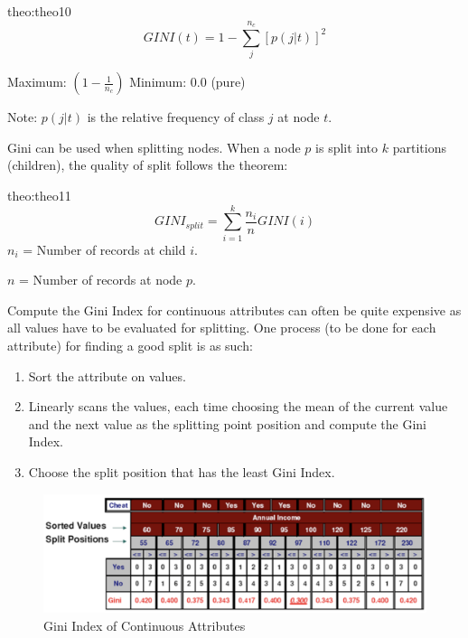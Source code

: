 \begin{theo}{theo:theo10}
    \label{eq:giniindex}
        \[
            GINI(t) = 1 - \sum_j^{n_c}\left[p(j|t)\right]^2
        \]
        \begin{center}
            Maximum: $(1-\frac{1}{n_c})$ \qquad\qquad Minimum: $0.0$ (pure)
        \end{center}
        Note: $p(j|t)$ is the relative frequency of class $j$ at node $t$.
\end{theo}

Gini can be used when splitting nodes. When a node $p$ is split into $k$ partitions (children), the quality of split follows the theorem:

\begin{theo}{theo:theo11}
    \label{eq:ginisplit}
        \[
            GINI_{split} = \sum_{i=1}^{k}\frac{n_i}{n}GINI(i)
        \]
        $n_i$ = Number of records at child $i$.

        $n$ = Number of records at node $p$.
\end{theo}

Compute the Gini Index for continuous attributes can often be quite expensive as all values have to be evaluated for splitting.
One process (to be done for each attribute) for finding a good split is as such:

\begin{enumerate}
    \item Sort the attribute on values.
    \item Linearly scans the values, each time choosing the mean of the current value and the next value as the splitting point position and compute the Gini Index.
    \item Choose the split position that has the least Gini Index.
\end{enumerate}

\begin{figure}[H]
    \centering
    \includegraphics[scale=0.4]{figures/continuousgini.png}
    \caption{Gini Index of Continuous Attributes}
\end{figure}

